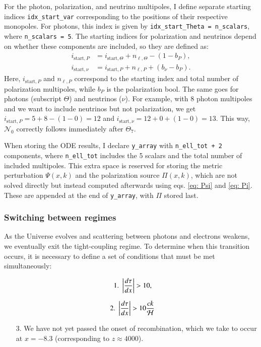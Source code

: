 \documentclass{aa}
\numberwithin{equation}{section}
\numberwithin{table}{section}
\numberwithin{figure}{section}
\begin{document}
For the photon, polarization, and neutrino multipoles, I define separate starting indices \verb|idx_start_var| corresponding to the positions of their respective monopoles. For photons, this index is given by \verb|idx_start_Theta = n_scalars|, where \verb|n_scalars = 5|. The starting indices for polarization and neutrinos depend on whether these components are included, so they are defined as:
\begin{align*}
  i_{\text{start},P} &= i_{\text{start},\Theta} + n_{\ell,\Theta} - (1 - b_P), \\
  i_{\text{start},\nu} &= i_{\text{start},P} + n_{\ell,P} + (b_\nu - b_P).
\end{align*}
Here, $i_{\text{start},P}$ and $n_{\ell,P}$ correspond to the starting index and total number of polarization multipoles, while $b_P$ is the polarization bool. The same goes for photons (subscript $\Theta$) and neutrinos ($\nu$). For example, with 8 photon multipoles and we want to include neutrinos but not polarization, we get $i_{\text{start},P} = 5 + 8 - (1 - 0) = 12$ and $i_{\text{start},\nu} = 12 + 0 + (1 - 0) = 13$. This way, $\mathcal{N}_0$ correctly follows immediately after $\Theta_7$.

When storing the ODE results, I declare \verb|y_array| with \verb|n_ell_tot + 2| components, where \verb|n_ell_tot| includes the 5 scalars and the total number of included multipoles. This extra space is reserved for storing the metric perturbation $\Psi(x, k)$ and the polarization source $\Pi(x, k)$, which are not solved directly but instead computed afterwards using eqs. \eqref{eq: Psi} and \eqref{eq: Pi}. These are appended at the end of \verb|y_array|, with $\Pi$ stored last.


\subsubsection{Switching between regimes}
As the Universe evolves and scattering between photons and electrons weakens, we eventually exit the tight-coupling regime. To determine when this transition occurs, it is necessary to define a set of conditions that must be met simultaneously: 
\begin{enumerate}
  \item [] \vspace{-19pt}\begin{equation} \hspace{-12.3pt}1. \hspace{3.1pt}
    \left|\frac{d\tau}{dx}\right| > 10,
  \end{equation}
  \item [] \vspace{-13pt}\begin{equation} \hspace{-12.3pt}2. \hspace{3.1pt}
    \left|\frac{d\tau}{dx}\right| > 10 \frac{ck}{\mathcal{H}}
  \end{equation}
  \item [3.] We have not yet passed the onset of recombination, which we take to occur at $x = -8.3$ (corresponding to $z \approx 4000$).  
\end{enumerate}
\end{document}
